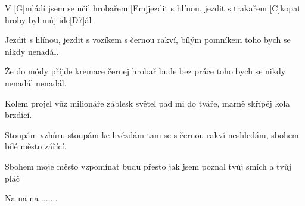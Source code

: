 
V [G]mládí jsem se učil hrobařem
[Em]jezdit s hlínou, jezdit s trakařem
[C]kopat hroby byl můj ide[D7]\null ál 

Jezdit s hlínou, jezdit s vozíkem
s černou rakví, bílým pomníkem
toho bych se nikdy nenadál.

Že do módy příjde kremace
černej hrobař bude bez práce
toho bych se nikdy nenadál nenadál.

Kolem projel vůz milionáře
záblesk světel pad mi do tváře,
marně skřípěj kola brzdící.

Stoupám vzhůru stoupám ke hvězdám
tam se s černou rakví neshledám,
sbohem bílé město zářící.

Sbohem moje město
vzpomínat budu přesto
jak jsem poznal tvůj smích a tvůj pláč

Na na na .......

